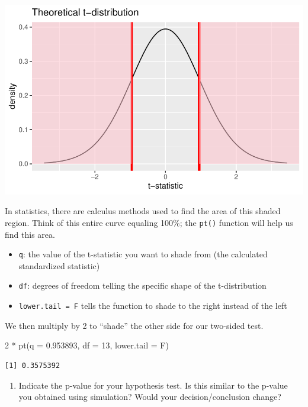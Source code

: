 \documentclass[
  letterpaper,
  DIV=11,
  numbers=noendperiod]{scrartcl}
\newenvironment{Shaded}{\begin{snugshade}}{\end{snugshade}}
\newcommand{\AttributeTok}[1]{\textcolor[rgb]{0.40,0.45,0.13}{#1}}
\newcommand{\DecValTok}[1]{\textcolor[rgb]{0.68,0.00,0.00}{#1}}
\newcommand{\FloatTok}[1]{\textcolor[rgb]{0.68,0.00,0.00}{#1}}
\newcommand{\FunctionTok}[1]{\textcolor[rgb]{0.28,0.35,0.67}{#1}}
\newcommand{\NormalTok}[1]{\textcolor[rgb]{0.00,0.23,0.31}{#1}}
\newcommand{\SpecialCharTok}[1]{\textcolor[rgb]{0.37,0.37,0.37}{#1}}
\providecommand{\tightlist}{%
  \setlength{\itemsep}{0pt}\setlength{\parskip}{0pt}}\usepackage{longtable,booktabs,array}
\begin{document}
\includegraphics{activity5-cholesterol-I-key_files/figure-pdf/t-dist-1.pdf}

In statistics, there are calculus methods used to find the area of this
shaded region. Think of this entire curve equaling 100\%; the
\texttt{pt()} function will help us find this area.

\begin{itemize}
\tightlist
\item
  \texttt{q}: the value of the t-statistic you want to shade from (the
  calculated standardized statistic)
\item
  \texttt{df}: degrees of freedom telling the specific shape of the
  t-distribution
\item
  \texttt{lower.tail\ =\ F} tells the function to shade to the right
  instead of the left
\end{itemize}

We then multiply by 2 to ``shade'' the other side for our two-sided
test.

\begin{Shaded}
\begin{Highlighting}[]
\DecValTok{2} \SpecialCharTok{*} \FunctionTok{pt}\NormalTok{(}\AttributeTok{q =} \FloatTok{0.953893}\NormalTok{, }\AttributeTok{df =} \DecValTok{13}\NormalTok{, }\AttributeTok{lower.tail =}\NormalTok{ F)}
\end{Highlighting}
\end{Shaded}

\begin{verbatim}
[1] 0.3575392
\end{verbatim}

\begin{enumerate}
\def\labelenumi{\arabic{enumi}.}
\setcounter{enumi}{27}
\tightlist
\item
  Indicate the p-value for your hypothesis test. Is this similar to the
  p-value you obtained using simulation? Would your decision/conclusion
  change?
\end{enumerate}
\end{document}
